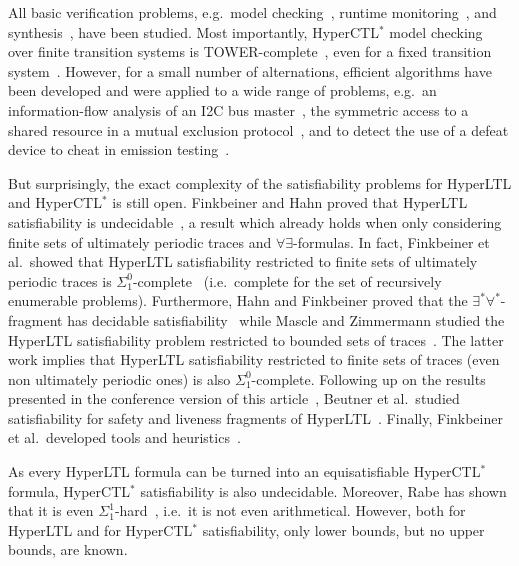 \documentclass[dvipsnames,10pt,a4paper]{amsart}
\theoremstyle{definition}
\theoremstyle{remark}
\newcommand{\hyltl}{{HyperLTL}\xspace}
\newcommand{\hyctlstar}{{HyperCTL$^*$}\xspace}
\begin{document}
All basic verification problems, e.g.\ model checking~\cite{DBLP:conf/cav/BeutnerF22,DBLP:journals/corr/abs-2301-11229,Finkbeiner21,FinkbeinerRS15}, runtime monitoring~\cite{AgrawalB16,BonakdarpourF16,BrettSB17,DBLP:conf/csfw/BonakdarpourF18,DBLP:conf/atva/CoenenFHHS21,FinkbeinerHST18}, and synthesis~\cite{BonakdarpourF20,FinkbeinerHHT20,FinkbeinerHLST20}, have been studied. Most importantly, \hyctlstar model checking over finite transition systems is TOWER-complete~\cite{FinkbeinerRS15}, even for a fixed transition system~\cite{MZ20}. 
However, for a small number of alternations, efficient algorithms have been developed and were applied to a wide range of problems, e.g.\ an information-flow analysis of an I2C bus master~\cite{FinkbeinerRS15}, the symmetric access to a shared resource in a mutual exclusion protocol~\cite{FinkbeinerRS15}, and to detect the use of a defeat device to cheat in emission testing~\cite{BartheDFH16}.

But surprisingly, the exact complexity of the satisfiability problems for \hyltl and \hyctlstar is still open. 
Finkbeiner and Hahn proved that \hyltl satisfiability is undecidable~\cite{FinkbeinerH16}, a result which already holds when only considering finite sets of ultimately periodic traces
 and $\forall\exists$-formulas. 
In fact, Finkbeiner et al.\ showed that \hyltl satisfiability restricted to finite sets of ultimately periodic traces is $\Sigma_1^0$-complete~\cite{FHH18} (i.e.\ complete for the set of recursively enumerable problems).
Furthermore, Hahn and Finkbeiner proved that the $\exists^*\forall^*$-fragment has decidable satisfiability~\cite{FinkbeinerH16} while Mascle and Zimmermann studied the \hyltl satisfiability problem restricted to bounded sets of traces~\cite{MZ20}. The latter work implies that \hyltl satisfiability restricted to finite sets of traces (even non ultimately periodic ones) is also $\Sigma_1^0$-complete.
Following up on the results presented in the conference version of this article~\cite{DBLP:conf/mfcs/FortinKT021}, Beutner et al.\ studied satisfiability for safety and liveness fragments of \hyltl~\cite{DBLP:conf/lics/BeutnerCFHK22}.
Finally, Finkbeiner et al.\ developed tools and heuristics~\cite{DBLP:journals/corr/abs-2301-11229,FHH18,FinkbeinerHS17}.

As every \hyltl formula can be turned into an equisatisfiable \hyctlstar formula, \hyctlstar satisfiability is also undecidable. 
Moreover, Rabe has shown that it is even $\Sigma_1^1$-hard~\cite{Rabe16}, i.e.\ it is not even arithmetical.
However, both for \hyltl and for \hyctlstar satisfiability, only lower bounds, but no upper bounds, are known. 
\end{document}
